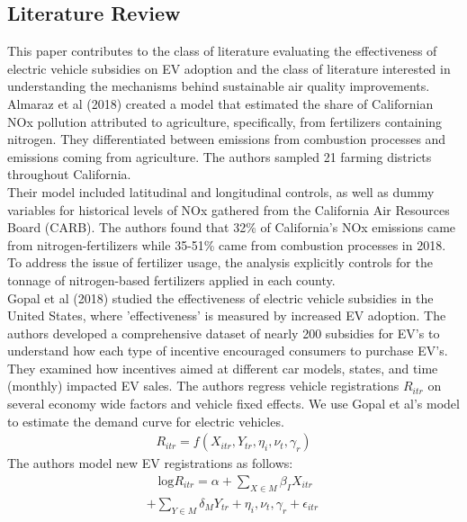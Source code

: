 \documentclass[12pt]{article}
\newcommand\tab[1][.50cm]{\hspace*{#1}}
\begin{document}
\begin{multicols}{2}
		\section*{Literature Review}
		\tab This paper contributes to the class of literature evaluating the effectiveness of electric vehicle subsidies on EV adoption and the class of literature interested in understanding the mechanisms behind sustainable air quality improvements. 
		\tab Almaraz et al (2018) created a model that estimated the share of Californian NOx pollution attributed to agriculture, specifically, from fertilizers containing nitrogen. They differentiated between emissions from combustion processes and emissions coming from agriculture. The authors sampled 21 farming districts throughout California.\\ \tab Their model included latitudinal and longitudinal controls, as well as dummy variables for historical levels of NOx gathered from the California Air Resources Board (CARB). The authors found that 32\% of California’s NOx emissions came from nitrogen-fertilizers while 35-51\% came from combustion processes in 2018. To address the issue of fertilizer usage, the analysis explicitly controls for the tonnage of nitrogen-based fertilizers applied in each county. 
		\\
		\tab Gopal et al (2018) studied the effectiveness of electric vehicle subsidies in the United States, where 'effectiveness' is measured by increased EV adoption. The authors developed a comprehensive dataset of nearly 200 subsidies for EV's to understand how each type of incentive encouraged consumers to purchase EV's.
		\\
		\tab They examined how incentives aimed at different car models, states, and time (monthly) impacted EV sales. The authors regress vehicle registrations $R_{itr}$ on several economy wide factors and vehicle fixed effects. We use Gopal et al's model to estimate the demand curve for electric vehicles.\\
		\begin{align}
			\ R_{itr}= f(X_{itr}, Y_{tr}, \eta_i, \nu_t, \gamma_r)\ 
			\label{eqn:1}
		\end{align}
		The authors model new EV registrations as follows:
		\begin{align}
			\ \text{log} R_{itr}= \alpha + \sum\limits_{X \in M} \beta_I X_{itr}\nonumber\end{align} \begin{align} + \sum\limits_{Y \in M}\delta_MY_{tr} + \eta_i, \nu_t, \gamma_r + \epsilon_{itr}\ 

\end{align}
\end{multicols}
\end{document}
